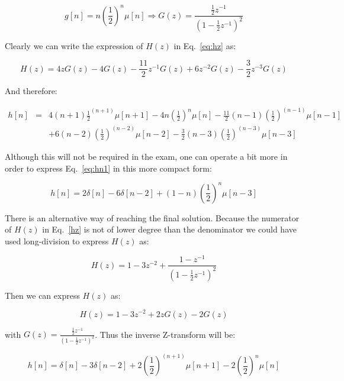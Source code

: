 \documentclass[a4paper,11pt,oneside]{article}
\begin{document}
\begin{equation}
g[n] = n\left(\frac{1}{2}\right)^n\mu[n] \Rightarrow G(z)=\frac{\frac{1}{2}z^{-1}}{(1-\frac{1}{2}z^{-1})^2}
\end{equation}

Clearly we can write the expression of $H(z)$ in Eq.~\ref{eq:hz} as:


\[
H(z)=4zG(z)-4G(z)-\frac{11}{2}z^{-1}G(z)+6z^{-2}G(z)-\frac{3}{2}z^{-3}G(z)
\]

And therefore:

\begin{equation}\label{eq:hn1}
\begin{array}{lll}
h[n]&=&4(n+1)\frac{1}{2}^{(n+1)}\mu[n+1]-4n\left(\frac{1}{2}\right)^n\mu[n]-\frac{11}{2}(n-1)\left(\frac{1}{2}\right)^{(n-1)}\mu[n-1]\\
&&+6(n-2)\left(\frac{1}{2}\right)^{(n-2)}\mu[n-2]-\frac{3}{2}(n-3)\left(\frac{1}{2}\right)^{(n-3)}\mu[n-3]
\end{array}
\end{equation}


Although this will not be required in the exam, one can operate a bit more in order to express Eq.~\ref{eq:hn1} in this more compact form:

\begin{equation}\label{final}
h[n]=2\delta[n]-6\delta[n-2]+(1-n)\left(\frac{1}{2}\right)^n\mu[n-3]
\end{equation}

There is an alternative way of reaching the final solution. Because the numerator of $H(z)$ in Eq.~\ref{hz} is not of lower degree than the denominator we could have used long-division to express $H(z)$ as:

\begin{equation}\label{eq:zeros}
H(z)=1-3z^{-2} + \frac{1-z^{-1}}{\left(1-\frac{1}{2}z^{-1}\right)^2}
\end{equation}

Then we can express $H(z)$ as:

\[
H(z)=1-3z^{-2} + 2zG(z)-2G(z)
\]

with $G(z)=\frac{\frac{1}{2}z^{-1}}{(1-\frac{1}{2}z^{-1})^2}$. Thus the inverse Z-transform will be:

\begin{equation}
h[n]=\delta[n]-3\delta[n-2]+2\left(\frac{1}{2}\right)^{(n+1)}\mu[n+1]-2\left(\frac{1}{2}\right)^{n}\mu[n]
\end{equation}
\end{document}
